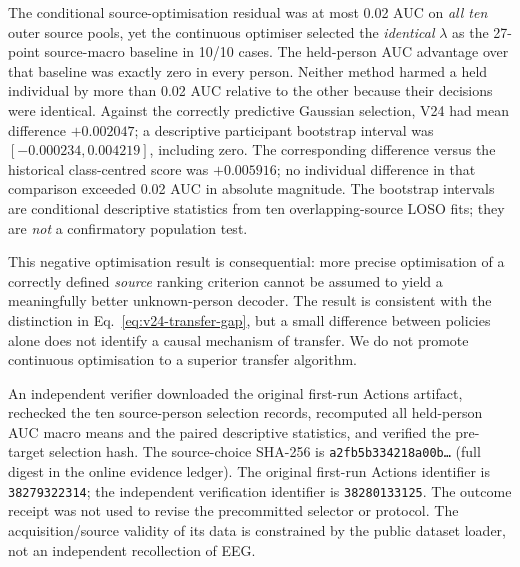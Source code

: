 The conditional source-optimisation residual was at most
0.02 AUC on \emph{all ten} outer source pools, yet the
continuous optimiser selected the \emph{identical}
$\lambda$ as the 27-point source-macro baseline in
10/10 cases. The held-person AUC advantage over that
baseline was exactly zero in every person. Neither
method harmed a held individual by more than 0.02 AUC
relative to the other because their decisions were
identical. Against the correctly predictive Gaussian
selection, V24 had mean difference $+0.002047$; a
descriptive participant bootstrap interval was
$[-0.000234,0.004219]$, including zero. The corresponding
difference versus the historical class-centred score
was $+0.005916$; no individual difference in that
comparison exceeded 0.02 AUC in absolute magnitude.
The bootstrap intervals are conditional descriptive
statistics from ten overlapping-source LOSO fits;
they are \emph{not} a confirmatory population test.

This negative optimisation result is consequential:
more precise optimisation of a correctly defined
\emph{source} ranking criterion cannot be assumed
to yield a meaningfully better unknown-person
decoder. The result is consistent with the
distinction in Eq.~\eqref{eq:v24-transfer-gap},
but a small difference between policies alone
does not identify a causal mechanism of transfer.
We do not promote continuous optimisation to a
superior transfer algorithm.

An independent verifier downloaded the original
first-run Actions artifact, rechecked the ten
source-person selection records, recomputed all
held-person AUC macro means and the paired descriptive
statistics, and verified the pre-target selection
hash. The source-choice SHA-256 is
\texttt{a2fb5b334218a00b\ldots} (full digest in the online evidence ledger).
The original first-run Actions identifier is
\texttt{38279322314}; the independent verification
identifier is \texttt{38280133125}. The outcome
receipt was not used to revise the precommitted
selector or protocol. The acquisition/source
validity of its data is constrained by the
public dataset loader, not an independent
recollection of EEG.
